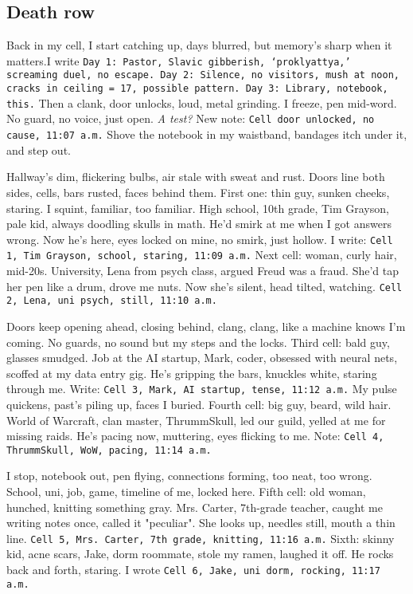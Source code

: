 \documentclass[12pt,oneside]{book}
\newcommand{\note}[1]{\texttt{#1}}
\begin{document}
\subsection*{Death row}
Back in my cell, I start catching up, days blurred, but memory’s sharp when it matters.I write \note{Day 1: Pastor, Slavic gibberish, ‘proklyattya,’ screaming duel, no escape. Day 2: Silence, no visitors, mush at noon, cracks in ceiling = 17, possible pattern. Day 3: Library, notebook, this.} Then a clank, door unlocks, loud, metal grinding. I freeze, pen mid-word. No guard, no voice, just open. \textit{A test?} New note: \note{Cell door unlocked, no cause, 11:07 a.m.} Shove the notebook in my waistband, bandages itch under it, and step out.

Hallway’s dim, flickering bulbs, air stale with sweat and rust. Doors line both sides, cells, bars rusted, faces behind them. First one: thin guy, sunken cheeks, staring. I squint, familiar, too familiar. High school, 10th grade, Tim Grayson, pale kid, always doodling skulls in math. He’d smirk at me when I got answers wrong. Now he’s here, eyes locked on mine, no smirk, just hollow. I write: \note{Cell 1, Tim Grayson, school, staring, 11:09 a.m.} Next cell: woman, curly hair, mid-20s. University, Lena from psych class, argued Freud was a fraud. She’d tap her pen like a drum, drove me nuts. Now she’s silent, head tilted, watching. \note{Cell 2, Lena, uni psych, still, 11:10 a.m.}

Doors keep opening ahead, closing behind, clang, clang, like a machine knows I’m coming. No guards, no sound but my steps and the locks. Third cell: bald guy, glasses smudged. Job at the AI startup, Mark, coder, obsessed with neural nets, scoffed at my data entry gig. He’s gripping the bars, knuckles white, staring through me. Write: \note{Cell 3, Mark, AI startup, tense, 11:12 a.m.} My pulse quickens, past’s piling up, faces I buried. Fourth cell: big guy, beard, wild hair. World of Warcraft, clan master, ThrummSkull, led our guild, yelled at me for missing raids. He’s pacing now, muttering, eyes flicking to me. Note: \note{Cell 4, ThrummSkull, WoW, pacing, 11:14 a.m.}

I stop, notebook out, pen flying, connections forming, too neat, too wrong. School, uni, job, game, timeline of me, locked here. Fifth cell: old woman, hunched, knitting something gray. Mrs. Carter, 7th-grade teacher, caught me writing notes once, called it "peculiar". She looks up, needles still, mouth a thin line. \note{Cell 5, Mrs. Carter, 7th grade, knitting, 11:16 a.m.} Sixth: skinny kid, acne scars, Jake, dorm roommate, stole my ramen, laughed it off. He rocks back and forth, staring. I wrote \note{Cell 6, Jake, uni dorm, rocking, 11:17 a.m.}
\end{document}
